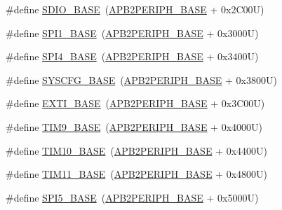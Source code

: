 \begin{DoxyCompactItemize}
\item 
\#define \hyperlink{group___peripheral__memory__map_ga95dd0abbc6767893b4b02935fa846f52}{S\+D\+I\+O\+\_\+\+B\+A\+SE}~(\hyperlink{group___peripheral__memory__map_ga25b99d6065f1c8f751e78f43ade652cb}{A\+P\+B2\+P\+E\+R\+I\+P\+H\+\_\+\+B\+A\+SE} + 0x2\+C00\+U)
\item 
\#define \hyperlink{group___peripheral__memory__map_ga50cd8b47929f18b05efbd0f41253bf8d}{S\+P\+I1\+\_\+\+B\+A\+SE}~(\hyperlink{group___peripheral__memory__map_ga25b99d6065f1c8f751e78f43ade652cb}{A\+P\+B2\+P\+E\+R\+I\+P\+H\+\_\+\+B\+A\+SE} + 0x3000\+U)
\item 
\#define \hyperlink{group___peripheral__memory__map_gac5cfaedf263cee1e79554665f921c708}{S\+P\+I4\+\_\+\+B\+A\+SE}~(\hyperlink{group___peripheral__memory__map_ga25b99d6065f1c8f751e78f43ade652cb}{A\+P\+B2\+P\+E\+R\+I\+P\+H\+\_\+\+B\+A\+SE} + 0x3400\+U)
\item 
\#define \hyperlink{group___peripheral__memory__map_ga62246020bf3b34b6a4d8d0e84ec79d3d}{S\+Y\+S\+C\+F\+G\+\_\+\+B\+A\+SE}~(\hyperlink{group___peripheral__memory__map_ga25b99d6065f1c8f751e78f43ade652cb}{A\+P\+B2\+P\+E\+R\+I\+P\+H\+\_\+\+B\+A\+SE} + 0x3800\+U)
\item 
\#define \hyperlink{group___peripheral__memory__map_ga87371508b3bcdcd98cd1ec629be29061}{E\+X\+T\+I\+\_\+\+B\+A\+SE}~(\hyperlink{group___peripheral__memory__map_ga25b99d6065f1c8f751e78f43ade652cb}{A\+P\+B2\+P\+E\+R\+I\+P\+H\+\_\+\+B\+A\+SE} + 0x3\+C00\+U)
\item 
\#define \hyperlink{group___peripheral__memory__map_ga92ae902be7902560939223dd765ece08}{T\+I\+M9\+\_\+\+B\+A\+SE}~(\hyperlink{group___peripheral__memory__map_ga25b99d6065f1c8f751e78f43ade652cb}{A\+P\+B2\+P\+E\+R\+I\+P\+H\+\_\+\+B\+A\+SE} + 0x4000\+U)
\item 
\#define \hyperlink{group___peripheral__memory__map_ga3eff32f3801db31fb4b61d5618cad54a}{T\+I\+M10\+\_\+\+B\+A\+SE}~(\hyperlink{group___peripheral__memory__map_ga25b99d6065f1c8f751e78f43ade652cb}{A\+P\+B2\+P\+E\+R\+I\+P\+H\+\_\+\+B\+A\+SE} + 0x4400\+U)
\item 
\#define \hyperlink{group___peripheral__memory__map_ga3a4a06bb84c703084f0509e105ffaf1d}{T\+I\+M11\+\_\+\+B\+A\+SE}~(\hyperlink{group___peripheral__memory__map_ga25b99d6065f1c8f751e78f43ade652cb}{A\+P\+B2\+P\+E\+R\+I\+P\+H\+\_\+\+B\+A\+SE} + 0x4800\+U)
\item 
\#define \hyperlink{group___peripheral__memory__map_gac1c58d33414e167d478ecd0e31331dfa}{S\+P\+I5\+\_\+\+B\+A\+SE}~(\hyperlink{group___peripheral__memory__map_ga25b99d6065f1c8f751e78f43ade652cb}{A\+P\+B2\+P\+E\+R\+I\+P\+H\+\_\+\+B\+A\+SE} + 0x5000\+U)

\end{DoxyCompactItemize}
